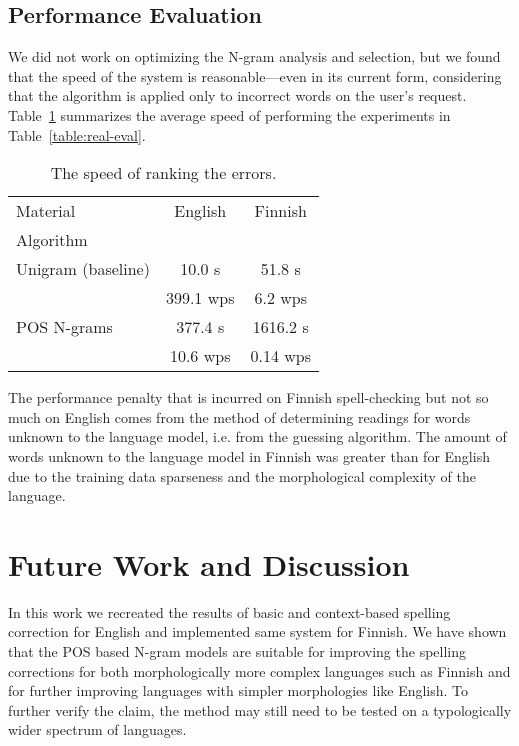\documentclass[postprint]{flammie}
\begin{document}
\subsection{Performance Evaluation}

We did not work on optimizing the N-gram analysis and selection,
but we found that the speed of the system is reasonable---even in its current
form, considering that the algorithm is applied only to incorrect words on
the user's request. Table~\ref{table:speed-eval} summarizes the average
speed of performing the experiments in Table~\ref{table:real-eval}.

\begin{table}
    \caption{The speed of ranking the errors.
    \label{table:speed-eval}}
  \begin{center}
      \begin{tabular}{lcc}
        \hline
        Material  & English &  Finnish \\
        Algorithm &         &          \\
        \hline
        Unigram (baseline)
 & 10.0 s    & 51.8 s  \\
 & 399.1 wps & 6.2 wps \\
        \hline
        POS N-grams 
 &   377.4 s & 1616.2 s \\
 & 10.6  wps & 0.14 wps \\
        \hline
      \end{tabular}
  \end{center}
\end{table}

The performance penalty that is incurred on Finnish spell-checking but not so
much on English comes from the method of determining readings for words unknown
to the language model, i.e. from the guessing algorithm. The amount of words
unknown to the language model in Finnish was greater than for English due to
the training data sparseness and the morphological complexity of the language.

\section{Future Work and Discussion}
\label{sec:future-work}

In this work we recreated the results of basic and context-based spelling
correction for English and implemented same system for Finnish.  We have shown
that the POS based N-gram models are suitable for improving the spelling
corrections for both morphologically more complex languages such as Finnish and
for further improving languages with simpler morphologies like English. To
further verify the claim, the method may still need to be tested on a
typologically wider spectrum of languages.
\end{document}
